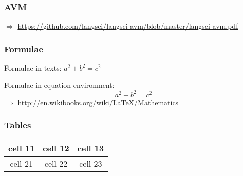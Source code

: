\begin{frame}
\frametitle{AVM}

\medskip

\noindent $\Rightarrow$ \url{https://github.com/langsci/langsci-avm/blob/master/langsci-avm.pdf}
\end{frame}

% 

\begin{frame}
\frametitle{Formulae}
Formulae in texts: $a^2 + b^2 = c^2$

\noindent Formulae in equation environment:
\begin{equation}
a^2 + b^2 = c^2
\end{equation}
$\Rightarrow$ \url{http://en.wikibooks.org/wiki/LaTeX/Mathematics}
\end{frame}

\begin{frame}
\frametitle{Tables}
\begin{tabular}{c|c|c}
\hline
cell 11 & cell 12 & cell 13 \\
\hline
cell 21 & cell 22 & cell 23 \\
\hline
\end{tabular}
\end{frame}
